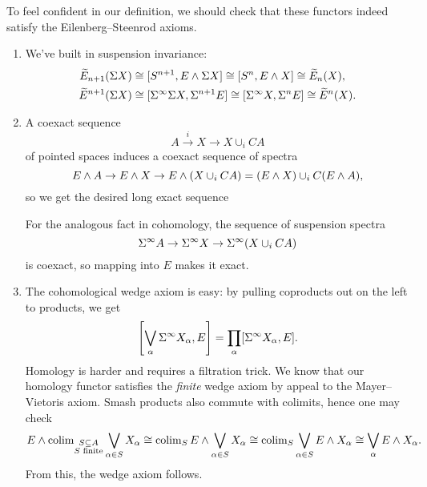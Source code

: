 To feel confident in our definition, we should check that these functors indeed satisfy the Eilenberg--Steenrod axioms.
\begin{enumerate}
    \item We've built in suspension invariance:
    \begin{align*}
    \widetilde E_{n+1}(\Sigma X) & \cong [S^{n+1}, E \wedge \Sigma X] \cong [S^n, E \wedge X] \cong \widetilde E_n(X), \\
    \widetilde E^{n+1}(\Sigma X) & \cong [\Sigma^\infty \Sigma X, \Sigma^{n+1} E] \cong [\Sigma^\infty X, \Sigma^n E] \cong \widetilde E^n(X).
    \end{align*}
    \item A coexact sequence \[A \xrightarrow i X \to X \cup_i CA\] of pointed spaces induces a coexact sequence of spectra \[E \wedge A \to E \wedge X \to E \wedge (X \cup_i CA) = (E \wedge X) \cup_i C(E \wedge A),\] so we get the desired long exact sequence
    \begin{center}
    \end{center}
    For the analogous fact in cohomology, the sequence of suspension spectra \[\Sigma^\infty A \to \Sigma^\infty X \to \Sigma^\infty (X \cup_i CA)\] is coexact, so mapping into $E$ makes it exact.
    \item The cohomological wedge axiom is easy: by pulling coproducts out on the left to products, we get \[\left[\bigvee_\alpha \Sigma^\infty X_\alpha, E\right] = \prod_\alpha [\Sigma^\infty X_\alpha, E].\]
    Homology is harder and requires a filtration trick.
    We know that our homology functor satisfies the \emph{finite} wedge axiom by appeal to the Mayer--Vietoris axiom.
    Smash products also commute with colimits, hence one may check \[E \wedge \operatorname{colim}_{\substack{S \subseteq A \\ \text{$S$ finite}}} \bigvee_{\alpha \in S} X_\alpha \cong \operatorname{colim}_S E \wedge \bigvee_{\alpha \in S} X_\alpha \cong \operatorname{colim}_S \bigvee_{\alpha \in S} E \wedge X_\alpha \cong \bigvee_\alpha E \wedge X_\alpha.\]
    From this, the wedge axiom follows.
\end{enumerate}

